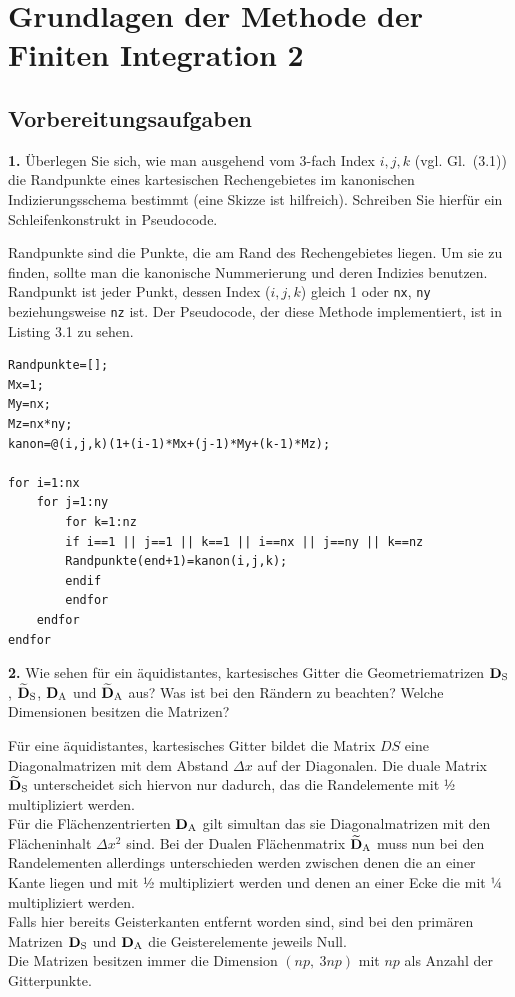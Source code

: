 \documentclass[Protokollheft.tex]{subfiles}
\begin{document}
\chapter{Grundlagen der Methode der Finiten Integration 2}

\section{Vorbereitungsaufgaben}

\begin{framed}
	\noindent \textbf{1.} Überlegen Sie sich, wie man ausgehend vom 3-fach Index $i,j,k$ (vgl. Gl.~(3.1)) die Randpunkte eines kartesischen Rechengebietes im kanonischen Indizierungsschema bestimmt (eine Skizze ist hilfreich). Schreiben Sie hierfür ein Schleifenkonstrukt in Pseudocode.\label{exer:boundIdx}
\end{framed}


Randpunkte sind die Punkte, die am Rand des Rechengebietes liegen. Um sie zu finden, sollte man die kanonische Nummerierung und deren Indizies benutzen. Randpunkt ist jeder Punkt, dessen Index ($i,j,k$) gleich 1 oder \lstinline{nx}, \lstinline{ny} beziehungsweise \lstinline{nz} ist. Der Pseudocode, der diese Methode implementiert, ist in Listing 3.1 zu sehen.
\begin{lstlisting}[caption={Pseudocode zur Ermittlung der Randpunkte },label={lst:mgn_RB}]
Randpunkte=[];
Mx=1;
My=nx;
Mz=nx*ny;
kanon=@(i,j,k)(1+(i-1)*Mx+(j-1)*My+(k-1)*Mz);

for i=1:nx
	for j=1:ny
		for k=1:nz
		if i==1 || j==1 || k==1 || i==nx || j==ny || k==nz
		Randpunkte(end+1)=kanon(i,j,k);
		endif
		endfor
	endfor
endfor
\end{lstlisting}
 

\begin{framed}
	\noindent \textbf{2.} Wie sehen für ein äquidistantes, kartesisches Gitter die Geometriematrizen $\mathbf{D}_\text{S}$, $\mathbf{\widetilde{D}}_\text{S}$, $\mathbf{D}_\text{A}$ und $\mathbf{\widetilde{D}}_\text{A}$ aus? Was ist bei den Rändern zu beachten? Welche Dimensionen besitzen die Matrizen?\label{exer:geoMatsStructure}
\end{framed}
\noindent
Für eine äquidistantes, kartesisches Gitter bildet die Matrix $DS$ eine Diagonalmatrizen mit dem Abstand $\Delta x$ auf der Diagonalen. Die duale Matrix $\mathbf{\widetilde{D}}_\text{S}$ unterscheidet sich hiervon nur dadurch, das die Randelemente mit ½ multipliziert werden. \\
Für die Flächenzentrierten $\mathbf{D}_\text{A}$ gilt simultan das sie Diagonalmatrizen mit den Flächeninhalt $\Delta x^2$ sind. Bei der Dualen Flächenmatrix $\mathbf{\widetilde{D}}_\text{A}$ muss nun bei den Randelementen allerdings unterschieden werden zwischen denen die an einer Kante liegen und mit ½ multipliziert werden und denen an einer Ecke die mit ¼ multipliziert werden. \\
Falls hier bereits Geisterkanten entfernt worden sind, sind bei den primären Matrizen $\mathbf{D}_\text{S}$ und $\mathbf{D}_\text{A}$ die Geisterelemente jeweils Null. \\
\noindent
Die Matrizen besitzen immer die Dimension  $(np,\ 3np)$ mit $np$ als Anzahl der Gitterpunkte.
\end{document}
